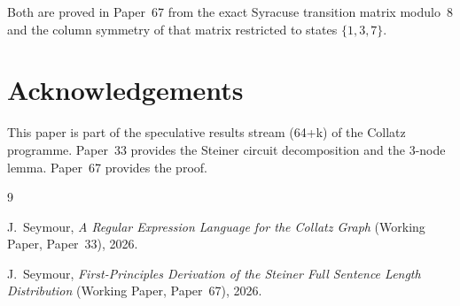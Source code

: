 \documentclass[12pt]{article}
\theoremstyle{definition}
\theoremstyle{remark}
\begin{document}
Both are proved in Paper~67 from the exact Syracuse transition matrix modulo~8
and the column symmetry of that matrix restricted to states $\{1,3,7\}$.

\section*{Acknowledgements}

This paper is part of the speculative results stream (64+k) of the Collatz
programme. Paper~33 provides the Steiner circuit decomposition and the 3-node
lemma. Paper~67 provides the proof.

\begin{thebibliography}{9}

J.~Seymour,
\emph{A Regular Expression Language for the Collatz Graph} (Working Paper, Paper~33),
2026.

J.~Seymour,
\emph{First-Principles Derivation of the Steiner Full Sentence Length Distribution}
(Working Paper, Paper~67),
2026.

\end{thebibliography}
\end{document}
